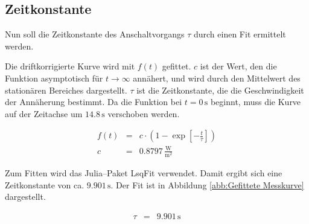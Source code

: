 \documentclass[12pt,a4paper]{scrartcl}
\numberwithin{equation}{section} %
\newcommand{\code}[1]{\textsf{#1}}
\begin{document}
	\subsection{Zeitkonstante}
	\label{Zeitkonstante}
	Nun soll die Zeitkonstante des Anschaltvorgangs $\tau$ durch einen Fit ermittelt werden.
	
	Die driftkorrigierte Kurve wird mit $f(t)$ gefittet. $c$ ist der Wert, den die Funktion asymptotisch für $t \rightarrow \infty$ annähert, und wird durch den Mittelwert des stationären Bereiches dargestellt. $\tau $ ist die Zeitkonstante, die die Geschwindigkeit der Annäherung bestimmt. Da die Funktion bei $t=0\mathrm{\,s}$ beginnt, muss die Kurve auf der Zeitachse um $14.8\mathrm{\,s}$ verschoben werden.
	
	\begin{eqnarray}
		f(t) &=& c \cdot \left(
		1 - \exp[-\frac{t}{\tau}]
		\right)
		\label{eq:Drift Fit} \\
		c &=& 0.8797 \mathrm{\,\frac{W}{m^2}}
	\end{eqnarray}
	
	\noindent
	Zum Fitten wird das \code{Julia}--Paket \code{LsqFit} \cite{Julia:LsqFit} verwendet. Damit ergibt sich eine Zeitkonstante von ca. $9.901 \mathrm{\,s}$. Der Fit ist in Abbildung \ref{abb:Gefittete Messkurve} dargestellt.
	
	\begin{eqnarray}
		\tau &=& 9.901 \mathrm{\,s}
	\end{eqnarray}
	
\end{document}

